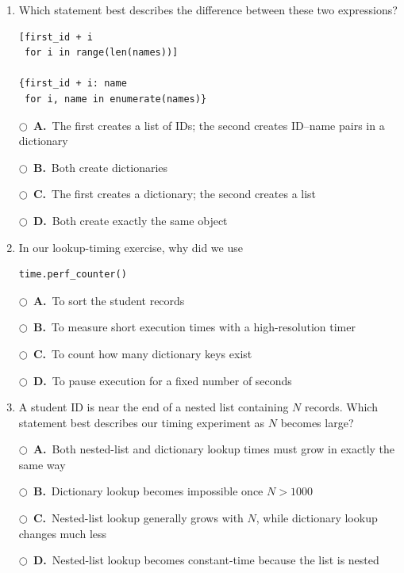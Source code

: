 \documentclass[11pt]{article}
\newcommand{\choice}[2]{%
    \par\noindent
    \(\bigcirc\)\ \textbf{#1.}\ #2
}
\begin{document}
\begin{enumerate}
Which key is associated with \texttt{"Diego"}?

\choice{A}{2601001}
\choice{B}{2601002}
\choice{C}{2601003}
\choice{D}{2601004}

\item Which statement best describes the difference between these two expressions?

\begin{verbatim}
[first_id + i
 for i in range(len(names))]

{first_id + i: name
 for i, name in enumerate(names)}
\end{verbatim}

\choice{A}{The first creates a list of IDs; the second creates ID--name pairs in a dictionary}
\choice{B}{Both create dictionaries}
\choice{C}{The first creates a dictionary; the second creates a list}
\choice{D}{Both create exactly the same object}

\item In our lookup-timing exercise, why did we use

\begin{verbatim}
time.perf_counter()
\end{verbatim}

\choice{A}{To sort the student records}
\choice{B}{To measure short execution times with a high-resolution timer}
\choice{C}{To count how many dictionary keys exist}
\choice{D}{To pause execution for a fixed number of seconds}

\item A student ID is near the end of a nested list containing \(N\) records. Which statement best describes our timing experiment as \(N\) becomes large?

\choice{A}{Both nested-list and dictionary lookup times must grow in exactly the same way}
\choice{B}{Dictionary lookup becomes impossible once \(N>1000\)}
\choice{C}{Nested-list lookup generally grows with \(N\), while dictionary lookup changes much less}
\choice{D}{Nested-list lookup becomes constant-time because the list is nested}

\end{enumerate}
\end{document}
